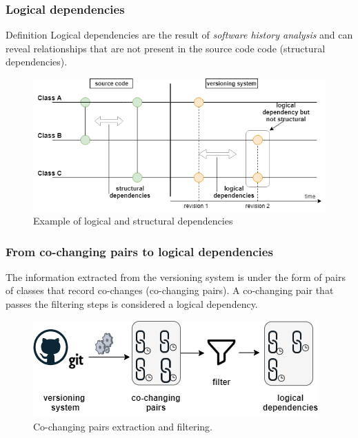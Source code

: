 \documentclass{beamer}
\begin{document}

 \begin{frame}
\frametitle{Logical dependencies}
\begin{block}{Definition}
 Logical dependencies are the result of \textit{software history analysis} and can reveal relationships that are not present in the source code code (structural dependencies).
\end{block}

\begin{center}
     \begin{figure}
	\includegraphics[width=\textwidth]{fig1.png}
	\caption{\label{fig:fig1}Example of logical and structural dependencies}
     \end{figure}
\end{center}

\end{frame}

 \begin{frame}
\frametitle{From co-changing pairs to logical dependencies}
The information extracted from the versioning system is under the form of pairs of classes that record co-changes (co-changing pairs). A co-changing pair that passes the filtering steps is considered a logical dependency.

\begin{center}
     \begin{figure}
	\includegraphics[width=\textwidth]{co-change_to_ld.png}
	\caption{\label{fig:fig1}Co-changing pairs extraction and filtering.}
     \end{figure}
\end{center}
\end{frame}
\end{document}
